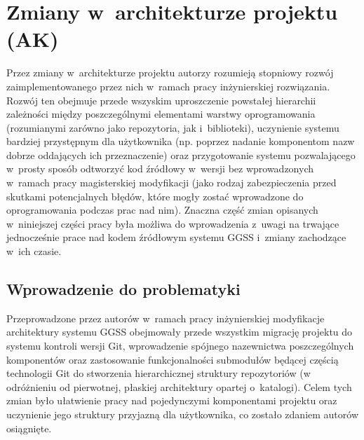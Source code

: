 \section{Zmiany w~architekturze projektu (AK)}
Przez zmiany w~architekturze projektu autorzy rozumieją stopniowy rozwój zaimplementowanego przez nich w~ramach pracy inżynierskiej rozwiązania. Rozwój ten obejmuje przede wszyskim uproszczenie powstałej hierarchii zależności między poszczególnymi elementami warstwy oprogramowania (rozumianymi zarówno jako repozytoria, jak i~biblioteki), uczynienie systemu bardziej przystępnym dla użytkownika (np. poprzez nadanie komponentom nazw dobrze oddających ich przeznaczenie) oraz przygotowanie systemu pozwalającego w~prosty sposób odtworzyć kod źródłowy w~wersji bez wprowadzonych w~ramach pracy magisterskiej modyfikacji (jako rodzaj zabezpieczenia przed skutkami potencjalnych błędów, które mogły zostać wprowadzone do oprogramowania podczas prac nad nim). Znaczna część zmian opisanych w~niniejszej części pracy była możliwa do wprowadzenia z~uwagi na trwające jednocześnie prace nad kodem źródłowym systemu GGSS i~zmiany zachodzące w~ich czasie.

\subsection{Wprowadzenie do problematyki}
Przeprowadzone przez autorów w~ramach pracy inżynierskiej modyfikacje architektury systemu GGSS obejmowały przede wszystkim migrację projektu do systemu kontroli wersji Git, wprowadzenie spójnego nazewnictwa poszczególnych komponentów oraz zastosowanie funkcjonalności submodułów będącej częścią technologii Git do stworzenia hierarchicznej struktury repozytoriów (w odróżnieniu od pierwotnej, płaskiej architektury opartej o~katalogi). Celem tych zmian było ułatwienie pracy nad pojedynczymi komponentami projektu oraz uczynienie jego struktury przyjazną dla użytkownika, co zostało zdaniem autorów osiągnięte. 

